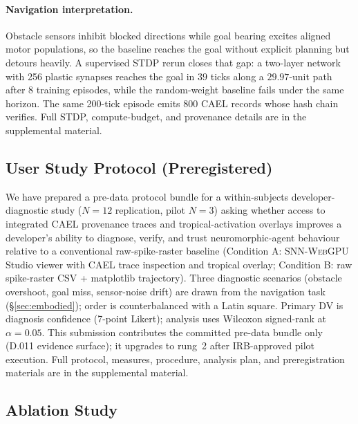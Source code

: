 \documentclass[10pt]{article}
\newcommand{\snnwebgpu}{\textsc{SNN-WebGPU}}
\newcommand{\cael}{\textsc{CAEL}}
\providecommand{\measuredFrom}[1]{}
\begin{document}
\paragraph{Navigation interpretation.}
Obstacle sensors inhibit blocked directions while goal bearing excites aligned
motor populations, so the baseline reaches the goal without explicit planning
but detours heavily.
A supervised STDP rerun closes that gap: a two-layer network with 256 plastic
synapses reaches the goal in $39$ ticks along a $29.97$-unit path after
8 training episodes, while the random-weight baseline fails under the same
horizon.
The same 200-tick episode emits 800 \cael{} records whose hash chain verifies.
Full STDP, compute-budget, and provenance details are in the supplemental
material.
\fi


\subsection{User Study Protocol (Preregistered)}
\label{sec:user-study}

We have prepared a pre-data protocol bundle for a within-subjects developer-diagnostic study ($N=12$ replication, pilot $N=3$) asking whether access to integrated \cael{} provenance traces and tropical-activation overlays improves a developer's ability to diagnose, verify, and trust neuromorphic-agent behaviour relative to a conventional raw-spike-raster baseline (Condition A: \snnwebgpu{} Studio viewer with CAEL trace inspection and tropical overlay; Condition B: raw spike-raster CSV + matplotlib trajectory).
Three diagnostic scenarios (obstacle overshoot, goal miss, sensor-noise drift) are drawn from the navigation task (\S\ref{sec:embodied}); order is counterbalanced with a Latin square.
Primary DV is diagnosis confidence (7-point Likert); analysis uses Wilcoxon signed-rank at $\alpha=0.05$.
This submission contributes the committed pre-data bundle only (D.011 evidence surface); it upgrades to rung~2 after IRB-approved pilot execution.
Full protocol, measures, procedure, analysis plan, and preregistration materials are in the supplemental material.
\measuredFrom{research/user-study-data/paper-2/preregistration.md}%

\subsection{Ablation Study}
\label{sec:ablation}
\end{document}
